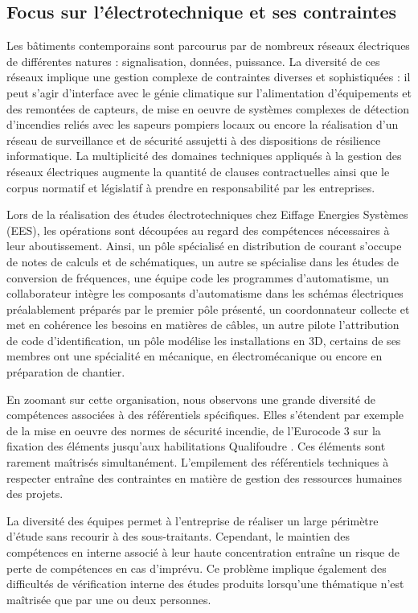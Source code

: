 \documentclass[a4paper,12pt]{article}
\begin{document}
\subsection{Focus sur l’électrotechnique et ses contraintes}
\label{sec:org7b7a302}
Les bâtiments contemporains sont parcourus par de nombreux réseaux électriques de différentes natures : signalisation, données, puissance. La diversité de ces réseaux implique une gestion complexe de contraintes diverses et sophistiquées : il peut s'agir d'interface avec le génie climatique sur l'alimentation d'équipements et des remontées de capteurs, de mise en oeuvre de systèmes complexes de détection d'incendies reliés avec les sapeurs pompiers locaux ou encore la réalisation d'un réseau de surveillance et de sécurité assujetti à des dispositions de résilience informatique. La multiplicité des domaines techniques appliqués à la gestion des réseaux électriques augmente la quantité de clauses contractuelles ainsi que le corpus normatif et législatif à prendre en responsabilité par les entreprises. 

Lors de la réalisation des études électrotechniques chez Eiffage Energies Systèmes (EES), les opérations sont découpées au regard des compétences nécessaires à leur aboutissement. Ainsi, un pôle spécialisé en distribution de courant s’occupe de notes de calculs et de schématiques, un autre se spécialise dans les études de conversion de fréquences, une équipe code les programmes d’automatisme, un collaborateur intègre les composants d’automatisme dans les schémas électriques préalablement préparés par le premier pôle présenté, un coordonnateur collecte et met en cohérence les besoins en matières de câbles, un autre pilote l’attribution de code d’identification, un pôle modélise les installations en 3D, certains de ses membres ont une spécialité en mécanique, en électromécanique ou encore en préparation de chantier. 

En zoomant sur cette organisation, nous observons une grande diversité de compétences associées à des référentiels spécifiques. Elles s’étendent par exemple de la mise en oeuvre des normes de sécurité incendie, de l’Eurocode 3 \autocite{icabEurocodesCodesConstructiona} sur la fixation des éléments jusqu’aux habilitations Qualifoudre \autocite{charpentierReferentielPourCertificationa}. Ces éléments sont rarement maîtrisés simultanément. L’empilement des référentiels techniques à respecter entraîne des contraintes en matière de gestion des ressources humaines des projets.

La diversité des équipes permet à l’entreprise de réaliser un large périmètre d’étude sans recourir à des sous-traitants. Cependant, le maintien des compétences en interne associé à leur haute concentration entraîne un risque de perte de compétences en cas d’imprévu. Ce problème implique également des difficultés de vérification interne des études produits lorsqu’une thématique n’est maîtrisée que par une ou deux personnes.
\end{document}

